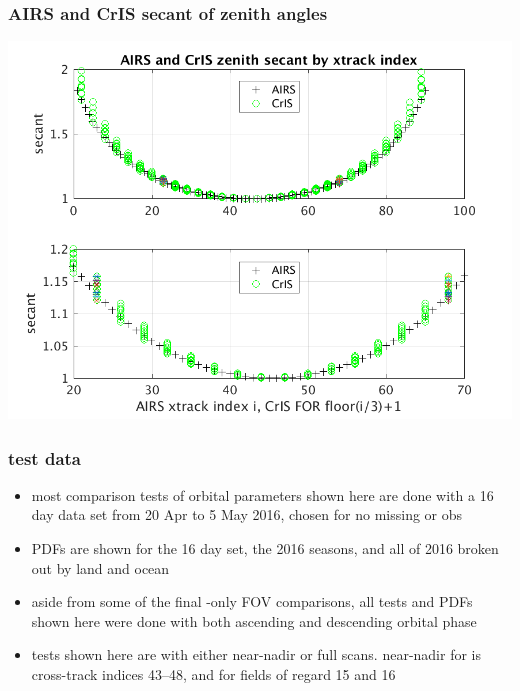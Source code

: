 \documentclass[11pt]{beamer}
\begin{document}
\begin{frame}
\frametitle{AIRS and CrIS secant of zenith angles}

\begin{center}
  \includegraphics[scale=0.7]{figures/AIRS_CrIS_secant_by_xtrack.png}
\end{center}
\end{frame} %
\begin{frame}
\frametitle{test data}

\begin{itemize}

 \item most comparison tests of orbital parameters shown here are
   done with a 16 day data set from 20 Apr to 5 May 2016, chosen for
   no missing {\airs} or {\cris} obs
 
 \item PDFs are shown for the 16 day set, the 2016 seasons, and all
   of 2016 broken out by land and ocean

 \item aside from some of the final {\cris}-only FOV comparisons,
   all tests and PDFs shown here were done with both ascending and
   descending orbital phase

 \item tests shown here are with either near-nadir or full scans.
   near-nadir for {\airs} is cross-track indices 43--48, and for
   {\cris} fields of regard 15 and 16

\end{itemize}
\end{frame}
\end{document}
